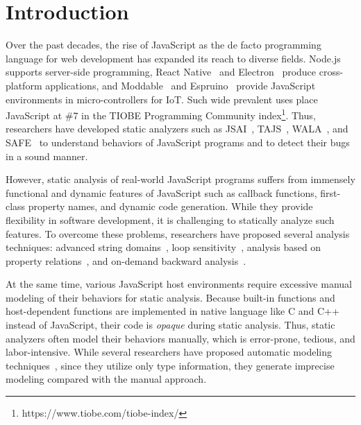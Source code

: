 \section{Introduction}\label{sec:intro}
Over the past decades, the rise of JavaScript as the de facto programming
language for web development has expanded its reach to diverse fields.
Node.js~\cite{nodejs} supports server-side programming, React
Native~\cite{react-native} and Electron~\cite{electron} produce cross-platform
applications, and Moddable~\cite{moddable} and Espruino~\cite{espruino}
provide JavaScript environments in micro-controllers for IoT.  Such wide prevalent
uses place JavaScript at \#7 in the TIOBE Programming Community
index\footnote{https://www.tiobe.com/tiobe-index/}.  Thus, researchers have
developed static analyzers such as JSAI~\cite{jsai}, TAJS~\cite{tajs},
WALA~\cite{wala}, and SAFE~\cite{safe,safe2} to understand behaviors of
JavaScript programs and to detect their bugs in a sound manner.

However, static analysis of real-world JavaScript programs suffers from immensely
functional and dynamic features of JavaScript such as callback
functions, first-class property names, and dynamic code generation.
While they provide flexibility in software development, it is
challenging to statically analyze such features.  To overcome these problems,
researchers have proposed several analysis techniques: advanced string
domains~\cite{string, regex, combining-string}, loop sensitivity~\cite{lsaECOOP,
lsaSPE}, analysis based on property relations~\cite{correlation, weaklyAPLAS,
weaklySPE, value-partitioning}, and on-demand backward
analysis~\cite{value-refinement}.

At the same time, various JavaScript host environments require excessive
manual modeling of their behaviors for static analysis.  Because built-in functions and
host-dependent functions are implemented in native language like C and
C++ instead of JavaScript, their code is \textit{opaque} during static
analysis.  Thus, static analyzers often model their behaviors
manually, which is error-prone, tedious, and labor-intensive.
While several researchers have proposed automatic modeling
techniques~\cite{safewapi, model-ts}, since they utilize only type
information, they generate imprecise modeling compared with the manual approach.

